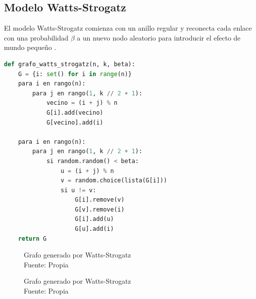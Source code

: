 \subsection{Modelo Watts-Strogatz}

El modelo Watts-Strogatz comienza con un anillo regular y reconecta cada enlace con una probabilidad \( \beta \) a un nuevo nodo aleatorio para introducir el efecto de mundo pequeño \citep{Watts1998} .

\begin{lstlisting}[language=Python]
def grafo_watts_strogatz(n, k, beta):
    G = {i: set() for i in range(n)}
    para i en rango(n):
        para j en rango(1, k // 2 + 1):
            vecino = (i + j) % n
            G[i].add(vecino)
            G[vecino].add(i)

    para i en rango(n):
        para j en rango(1, k // 2 + 1):
            si random.random() < beta:
                u = (i + j) % n
                v = random.choice(lista(G[i]))
                si u != v:
                    G[i].remove(v)
                    G[v].remove(i)
                    G[i].add(u)
                    G[u].add(i)
    return G
\end{lstlisting}
\begin{figure}[h]
\caption{Grafo generado por Watts-Strogatz\\Fuente: Propia}
\end{figure}

\begin{figure}[h]
\caption{Grafo generado por Watts-Strogatz\\Fuente: Propia}
\end{figure}

